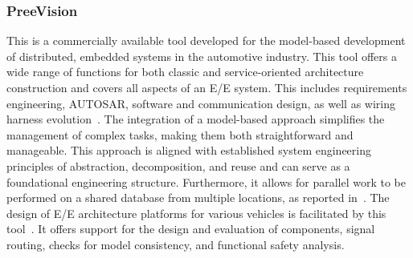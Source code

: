 \subsubsection{PreeVision} %
This is a commercially available tool developed for the model-based development of distributed, embedded systems in the automotive industry. This tool offers a wide range of functions for both classic and service-oriented architecture construction and covers all aspects of an E/E system. This includes requirements engineering, AUTOSAR, software and communication design, as well as wiring harness evolution~\cite{furst2009autosar}.
The integration of a model-based approach simplifies the management of complex tasks, making them both straightforward and manageable. This approach is aligned with established system engineering principles of abstraction, decomposition, and reuse and can serve as a foundational engineering structure. Furthermore, it allows for parallel work to be performed on a shared database from multiple locations, as reported in~\cite{ askaripoor2022architecture}.
The design of E/E architecture platforms for various vehicles is facilitated by this tool~\cite{schauffele2016architectural}. It offers support for the design and evaluation of components, signal routing, checks for model consistency, and functional safety analysis.

